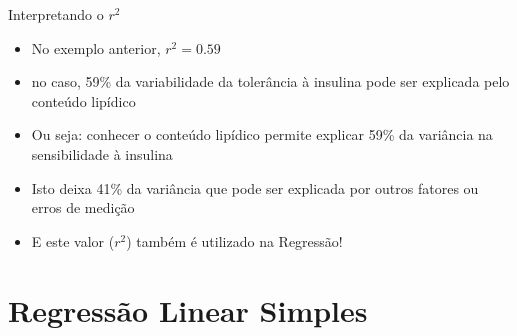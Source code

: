 \documentclass{beamer}
\begin{document}
\begin{frame}{Interpretando o $r^2$}
  \begin{itemize}
  \item No exemplo anterior, $r^2 = 0.59$
  \item no caso, 59\% da variabilidade da tolerância à insulina pode
    ser explicada pelo conteúdo lipídico
  \item Ou seja: conhecer o conteúdo lipídico permite explicar 59\%
    da variância na sensibilidade à insulina
  \item Isto deixa 41\% da variância que pode ser explicada por outros
    fatores ou erros de medição
  \item E este valor ($r^2$) também é utilizado na Regressão!
  \end{itemize}
\end{frame}


    

    

\section[Regressão]{Regressão Linear Simples}
\end{document}

